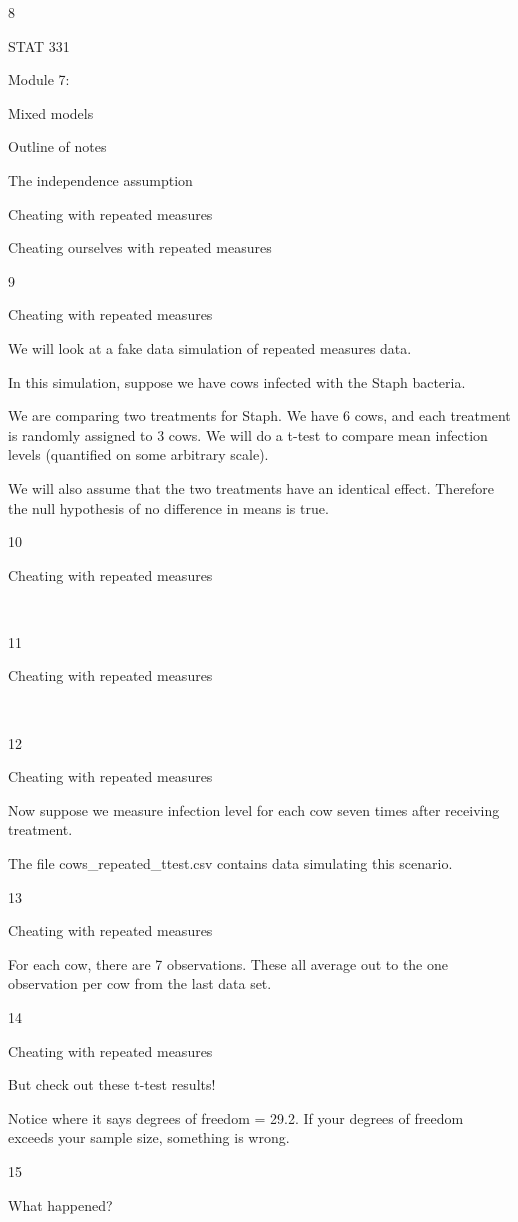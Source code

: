 \documentclass[
  letterpaper,
  DIV=11,
  numbers=noendperiod]{scrreprt}
\begin{document}
8

STAT 331

Module 7:

Mixed models

Outline of notes

The independence assumption

Cheating with repeated measures

Cheating ourselves with repeated measures

9

Cheating with repeated measures

We will look at a fake data simulation of repeated measures data.

In this simulation, suppose we have cows infected with the Staph
bacteria.

We are comparing two treatments for Staph. We have 6 cows, and each
treatment is randomly assigned to 3 cows. We will do a t-test to compare
mean infection levels (quantified on some arbitrary scale).

We will also assume that the two treatments have an identical effect.
Therefore the null hypothesis of no difference in means is true.

10

Cheating with repeated measures

~

11

Cheating with repeated measures

~

12

Cheating with repeated measures

Now suppose we measure infection level for each cow seven times after
receiving treatment.

The file cows\_repeated\_ttest.csv contains data simulating this
scenario.

13

Cheating with repeated measures

For each cow, there are 7 observations. These all average out to the one
observation per cow from the last data set.

14

Cheating with repeated measures

But check out these t-test results!

Notice where it says degrees of freedom = 29.2. If your degrees of
freedom exceeds your sample size, something is wrong.

15

What happened?
\end{document}
